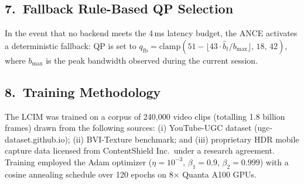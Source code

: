 \subsection{7.~Fallback Rule-Based QP Selection}\label{sec:fallback}

In the event that no backend meets the 4\,ms latency budget, the ANCE activates a
deterministic fallback: QP is set to $q_{\text{fb}} = \text{clamp}(51 -
\lfloor 43 \cdot \hat{b}_t / b_{\max} \rfloor,\, 18,\, 42)$, where
$b_{\max}$ is the peak bandwidth observed during the current session.

\subsection{8.~Training Methodology}

The LCIM was trained on a corpus of 240,000 video clips (totalling 1.8 billion frames)
drawn from the following sources: (i) YouTube-UGC dataset (ugc-dataset.github.io);
(ii) BVI-Texture benchmark; and (iii) proprietary HDR mobile capture data licensed
from ContentShield Inc.\ under a research agreement. Training employed the Adam
optimizer ($\eta = 10^{-3}$, $\beta_1 = 0.9$, $\beta_2 = 0.999$) with a cosine
annealing schedule over 120 epochs on 8$\times$ Quanta A100 GPUs.

\newpage
